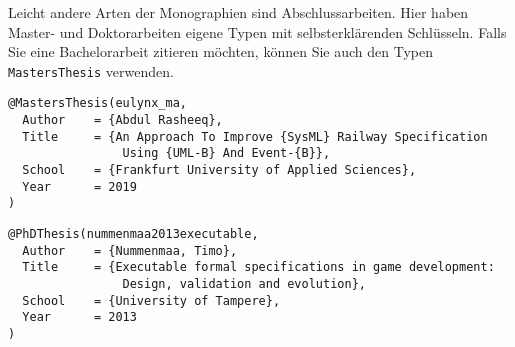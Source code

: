 Leicht andere Arten der Monographien sind Abschlussarbeiten.
Hier haben Master- und Doktorarbeiten eigene Typen mit selbsterklärenden Schlüsseln.
Falls Sie eine Bachelorarbeit zitieren möchten, können Sie auch den Typen \verb|MastersThesis| verwenden.

\begin{verbatim}
@MastersThesis(eulynx_ma,
  Author    = {Abdul Rasheeq},
  Title     = {An Approach To Improve {SysML} Railway Specification
                Using {UML-B} And Event-{B}},
  School    = {Frankfurt University of Applied Sciences},
  Year      = 2019
)
\end{verbatim}

\begin{verbatim}
@PhDThesis(nummenmaa2013executable,
  Author    = {Nummenmaa, Timo},
  Title     = {Executable formal specifications in game development:
                Design, validation and evolution},
  School    = {University of Tampere},
  Year      = 2013
)
\end{verbatim}
